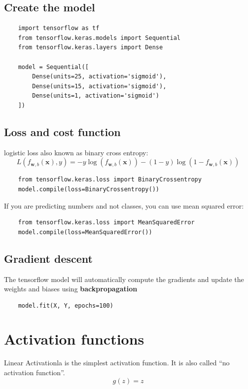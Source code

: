 \subsection*{Create the model}
\begin{verbatim}
    import tensorflow as tf
    from tensorflow.keras.models import Sequential
    from tensorflow.keras.layers import Dense

    model = Sequential([
        Dense(units=25, activation='sigmoid'),
        Dense(units=15, activation='sigmoid'),
        Dense(units=1, activation='sigmoid')
    ])
\end{verbatim}

\subsection*{Loss and cost function}
logistic loss also known as binary cross entropy:
\[ L(f_{\mathbf{w}, b}(\mathbf{x}), y) = -y \log(f_{\mathbf{w}, b}(\mathbf{x})) - (1 - y) \log(1 - f_{\mathbf{w}, b}(\mathbf{x})) \]
\begin{verbatim}
    from tensorflow.keras.loss import BinaryCrossentropy
    model.compile(loss=BinaryCrossentropy())
\end{verbatim}
If you are predicting numbers and not classes, you can use mean squared error:
\begin{verbatim}
    from tensorflow.keras.loss import MeanSquaredError
    model.compile(loss=MeanSquaredError())
\end{verbatim}

\subsection*{Gradient descent}
The tensorflow model will automatically compute the
 gradients and update the weights and biases using \textbf{backpropagation}\par
\begin{verbatim}
    model.fit(X, Y, epochs=100)
\end{verbatim}

\section{Activation functions}
\begin{dfnbox}{Linear Activation}{la}
     is the simplest activation function. 
    It is also called ``no activation function''.
    \begin{equation}
        g(z) = z
    \end{equation}
\end{dfnbox}

